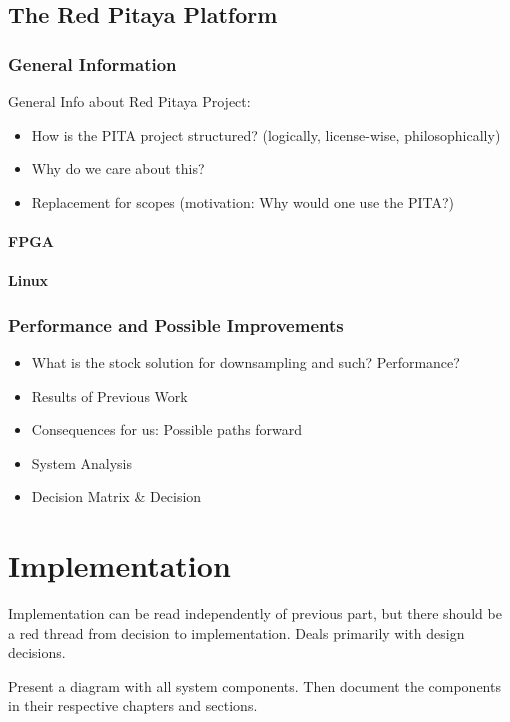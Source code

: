 \documentclass[a4paper,oneside]{alpenthesis/alpenthesis}
\begin{document}
\chapter{The Red Pitaya Platform}
\section{General Information}
General Info about Red Pitaya Project:
\begin{itemize}\firmlist
    \item How is the PITA project structured? (logically, license-wise, philosophically)
    \item Why do we care about this?
    \item Replacement for scopes (motivation: Why would one use the PITA?)
\end{itemize}
\subsection{FPGA}
\subsection{Linux}

\section{Performance and Possible Improvements}
\begin{itemize}
    \item
    What is the stock solution for downsampling and such? Performance?
    \item
    Results of Previous Work
    \item
    Consequences for us: Possible paths forward
    \item
    System Analysis
    \item Decision Matrix \& Decision
\end{itemize}

\part{Implementation}
Implementation can be read independently of previous part, but there should be
a  red thread  from decision  to implementation. Deals  primarily with  design
decisions.

Present a diagram with all  system components. Then document the components in
their respective chapters and sections.
\end{document}

